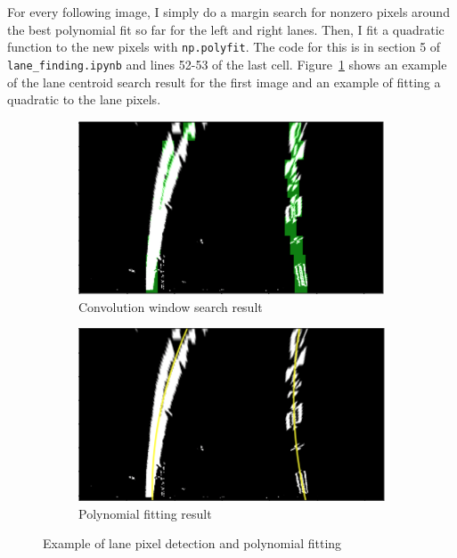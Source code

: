 \documentclass[12pt]{article}
\begin{document}
For every following image, I simply do a margin search for nonzero pixels around the best polynomial fit so far for the left and right lanes. Then, I fit a quadratic function to the new pixels with \texttt{np.polyfit}. The code for this is in section 5 of \texttt{lane\_finding.ipynb} and lines 52-53 of the last cell. Figure~\ref{fig:lane_pixels} shows an example of the lane centroid search result for the first image and an example of fitting a quadratic to the lane pixels.

\begin{figure}[h]
\centering
\begin{subfigure}{.5\textwidth}
  \centering
  \includegraphics[width=1\linewidth]{window_test.png}
  \caption{Convolution window search result}
\end{subfigure}%
\begin{subfigure}{.5\textwidth}
  \centering
  \includegraphics[width=1\linewidth]{polyfit_test.png}
  \caption{Polynomial fitting result}
\end{subfigure}
\caption{Example of lane pixel detection and polynomial fitting}
\label{fig:lane_pixels}
\end{figure}
\end{document}
